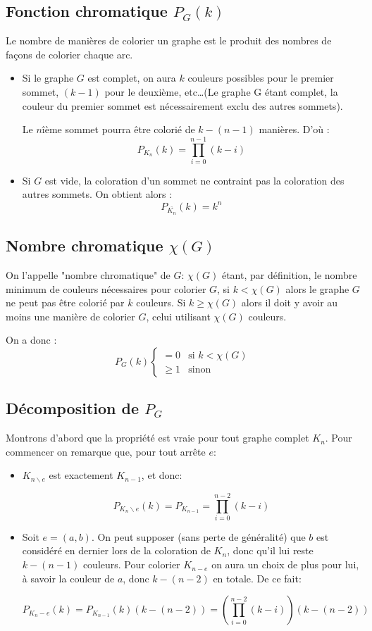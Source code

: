 \subsection{Fonction chromatique $P_G(k)$}
Le nombre de manières de colorier un graphe est le produit des nombres de façons de colorier chaque arc.
\begin{itemize}
\item Si le graphe $G$ est complet, on aura $k$ couleurs possibles pour le premier sommet, $(k-1)$ pour le deuxième, etc\ldots (Le graphe G étant complet, la couleur du premier sommet est nécessairement exclu des autres sommets).

Le $n$\^{ième} sommet pourra être colorié de $k-(n-1)$ manières. D'où :
\[ P_{K_n}(k)=\prod_{i=0}^{n-1}(k-i) \]

\item Si $G$ est vide, la coloration d'un sommet ne contraint pas la coloration des autres sommets. On obtient alors :
\[ P_{\overline{K_n}}(k)=k^n \]
\end{itemize}

\subsection{Nombre chromatique $\chi(G)$}
On l'appelle "nombre chromatique" de $G$: $\chi(G)$ étant, par définition, le nombre minimum de couleurs nécessaires pour colorier $G$, si $k < \chi(G)$ alors le graphe $G$ ne peut pas être colorié par $k$ couleurs. Si $k \geq \chi(G)$ alors il doit y avoir au moins une manière de colorier $G$, celui utilisant $\chi(G)$ couleurs.

On a donc :
\begin{displaymath}
	P_G(k) \left\{ \begin{array}{ll}
	=0 & \textrm{si $k < \chi(G)$} \\
	\geq 1 & \textrm{sinon}
	\end{array} \right.
\end{displaymath}

\subsection{Décomposition de $P_G$}
Montrons d'abord que la propriété est vraie pour tout graphe complet $K_n$. Pour commencer on remarque que, pour tout arrête $e$:

\begin{itemize}
\item $K_{n\backslash e}$ est exactement $K_{n-1}$, et donc: 

\[ P_{K_n\backslash e}(k) = P_{K_{n-1}} = \prod_{i=0}^{n-2}(k-i) \]


\item Soit $e = (a,b)$. On peut supposer (sans perte de généralité) que $b$ est considéré en dernier lors de la coloration de $K_n$, donc qu'il lui reste $k-(n-1)$ couleurs. Pour colorier $K_{n-e}$ on aura un choix de plus pour lui, à savoir la couleur de $a$, donc $k-(n-2)$ en totale. De ce fait:

\[ P_{K_n-e}(k) = P_{K_{n-1}}(k)(k-(n-2)) = (\prod_{i=0}^{n-2}(k-i))(k-(n-2)) \]
\end{itemize}


